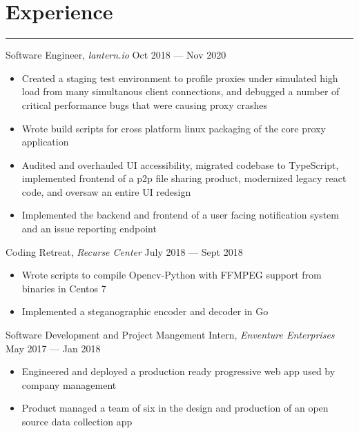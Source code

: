 \documentclass[12pt]{article}
\begin{document}
\vspace{-0.80cm}
\section*{Experience}
\vspace{-0.25cm}
\hrule
\vspace{0.25cm}

\noindent Software Engineer, \textit{lantern.io} \hfill Oct 2018 --- Nov 2020
\vspace{-0.1cm}
\begin{itemize}
  \itemsep-0.4em
\item Created a staging test environment to profile proxies under simulated high load from many simultanous client connections, and debugged a number of critical performance bugs that were causing proxy crashes
\item Wrote build scripts for cross platform linux packaging of the core proxy application
\item Audited and overhauled UI accessibility, migrated codebase to TypeScript, implemented frontend of a p2p file sharing product, modernized legacy react code, and oversaw an entire UI redesign
\item Implemented the backend and frontend of a user facing notification system and an issue reporting endpoint
\end{itemize}


\noindent Coding Retreat, \textit{Recurse Center} \hfill July 2018 --- Sept 2018
\vspace{-0.1cm}
\begin{itemize}
  \itemsep-0.4em
	\item Wrote scripts to compile Opencv-Python with FFMPEG support from binaries in Centos 7
        \item Implemented a steganographic encoder and decoder in Go
\end{itemize}

\noindent Software Development and Project Mangement Intern, \textit{Enventure Enterprises} \hfill May 2017 --- Jan 2018
\vspace{-0.1cm}
\begin{itemize}
  \itemsep-0.4em
	\item Engineered and deployed a production ready progressive web app used by company management
	\item Product managed a team of six in the design and production of an open source data collection app
\end{itemize}
\end{document}
